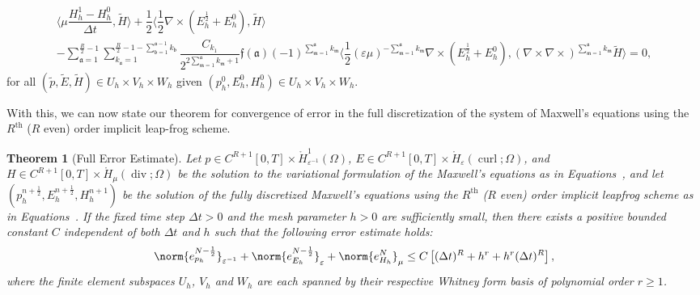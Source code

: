 \documentclass{amsart}
\theoremstyle{thmstyleone}%
\newtheorem{theorem}{Theorem}%
\theoremstyle{thmstyletwo}%
\theoremstyle{thmstylethree}%
\DeclareMathOperator{\curl}{curl}
\def\divgn{\operatorname{div}}
\newcommand{\aInnerproduct}[2]{\bigl\langle #1, #2 \bigr\rangle}
\begin{document}
\begin{subequations}
\begin{multline}
    \aInnerproduct{\mu \dfrac{H_h^1 - H_h^0}{\Delta t}}{\widetilde{H}} + \dfrac{1}{2} \aInnerproduct{\dfrac{1}{2} \nabla \times \left(E_h^{\frac{1}{2}} + E_h^0 \right)}{\widetilde{H}} \\ - \sum\limits_{\mathfrak{a} = 1}^{\frac{R}{2} - 1} \sum\limits_{k_\mathfrak{a} = 1}^{\frac{R}{2} - 1 - \sum\limits_{\mathfrak{b} = 1}^{\mathfrak{a} - 1} k_\mathfrak{b}} \dfrac{C_{k_1}}{2^{2 \sum\limits_{\mathfrak{m} = 1}^\mathfrak{a} k_\mathfrak{m} + 1}} \mathfrak{f}(\mathfrak{a}) (-1)^{\sum\limits_{\mathfrak{m} = 1}^\mathfrak{a} k_\mathfrak{m}} \aInnerproduct{\dfrac{1}{2} (\varepsilon \mu)^{-\sum\limits_{\mathfrak{m} = 1}^\mathfrak{a} k_\mathfrak{m}} \nabla \times \left( E_h^{\frac{1}{2}} + E_h^0 \right)}{\left( \nabla \times  \nabla \times \right)^{\sum\limits_{\mathfrak{m} = 1}^\mathfrak{a} k_\mathfrak{m}} \widetilde{H}} = 0, \label{eqn:maxwell_H0_lfR_full}
    \end{multline}
\end{subequations}
for all $(\widetilde{p}, \widetilde{E}, \widetilde{H}) \in U_h \times V_h \times W_h$ given $(p_h^0, E_h^0, H_h^0) \in U_h \times V_h \times W_h$. 

With this, we can now state our theorem for convergence of error in the full discretization of the system of Maxwell's equations using the $R^{\text{th}}$ ($R$ even) order implicit leap-frog scheme.

\begin{theorem}[Full Error Estimate]\label{thm:full_error_estmt_lfR}
Let $p \in C^{R+1}[0, T] \times \mathring{H}^1_{\varepsilon^{-1}}(\Omega)$, $E \in C^{R+1}[0, T] \times \mathring{H}_{\varepsilon}(\curl; \Omega)$, and $H \in C^{R+1}[0, T] \times \mathring{H}_{\mu}(\divgn; \Omega)$ be the solution to the variational formulation of the Maxwell's equations as in Equations~, and let $(p_h^{n + \frac{1}{2}}, E_h^{n + \frac{1}{2}}, H_h^{n + 1})$ be the solution of the fully discretized Maxwell's equations using the $R^{\text{th}}$ ($R$ even) order implicit leapfrog scheme as in Equations~. If the fixed time step $\Delta t > 0$ and the mesh parameter $h > 0$ are sufficiently small, then there exists a positive bounded constant $C$ independent of both $\Delta t$ and $h$ such that the following error estimate holds:
\[
  \norm{e_{p_h}^{N - \frac{1}{2}}}_{\varepsilon^{-1}} + \norm{e_{E_h}^{N - \frac{1}{2}}}_{\varepsilon} + \norm{e_{H_h}^N}_{\mu} \le C \left[ (\Delta t)^R + h^r + h^r (\Delta t)^R \right],
\]
where the finite element subspaces $U_h$, $V_h$ and $W_h$ are each spanned by their respective Whitney form basis of polynomial order $r \ge 1$.
\end{theorem}
 
\end{document}
